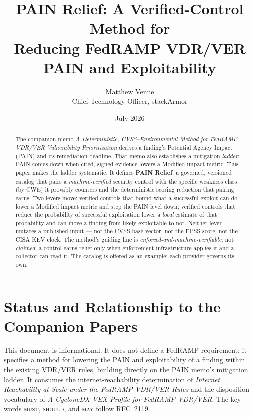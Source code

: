 \documentclass[11pt]{article}
\title{\bfseries PAIN Relief: A Verified-Control Method for\\
Reducing FedRAMP VDR/VER PAIN and Exploitability}
\author{Matthew Venne \\ \small Chief Technology Officer, stackArmor}
\date{July 2026}
\newcommand{\rfckw}[1]{\textsc{#1}}
\begin{document}
\maketitle

\begin{abstract}
\noindent
The companion memo \emph{A Deterministic, CVSS--Environmental Method for FedRAMP
VDR/VER Vulnerability Prioritization} derives a finding's Potential Agency
Impact (PAIN) and its remediation deadline. That memo also establishes a
mitigation \emph{ladder}: PAIN comes down when cited, signed evidence lowers a
Modified impact metric. This paper makes the ladder systematic. It defines
\textbf{PAIN Relief}: a governed, versioned catalog that pairs a
\emph{machine-verified} security control with the specific weakness class
(by CWE) it provably counters and the deterministic scoring reduction that
pairing earns. Two levers move: verified controls that bound what a successful
exploit can do lower a Modified impact metric and step the PAIN level down;
verified controls that reduce the probability of successful exploitation lower a
\emph{local} estimate of that probability and can move a finding from
likely-exploitable to not. Neither lever mutates a published input --- not the
CVSS base vector, not the EPSS score, not the CISA KEV clock. The method's
guiding line is \emph{enforced-and-machine-verifiable}, not \emph{claimed}: a
control earns relief only when enforcement infrastructure applies it and a
collector can read it. The catalog is offered as an example; each provider
governs its own.
\end{abstract}

\tableofcontents

\section{Status and Relationship to the Companion Papers}
This document is informational. It does not define a FedRAMP requirement; it
specifies a method for lowering the PAIN and exploitability of a finding within
the existing VDR/VER rules, building directly on the PAIN memo's mitigation
ladder. It consumes the internet-reachability determination of \emph{Internet
Reachability at Scale under the FedRAMP VDR/VER Rules} and the disposition
vocabulary of \emph{A CycloneDX VEX Profile for FedRAMP VDR/VER}. The key
words \rfckw{must}, \rfckw{should}, and \rfckw{may} follow RFC~2119.
\end{document}
